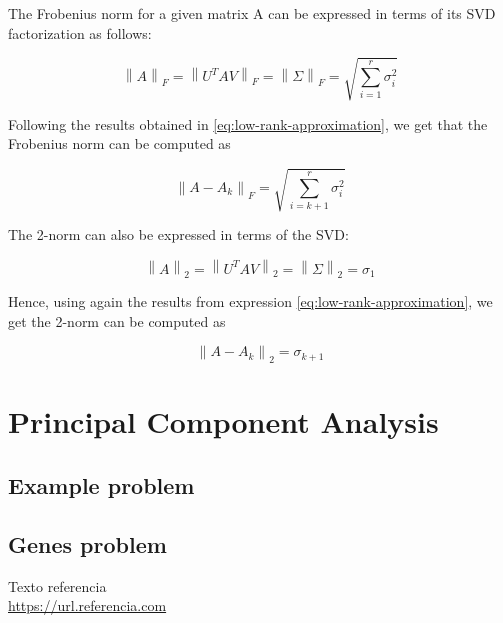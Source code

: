 \documentclass[11pt,a4paper]{article}
\begin{document}
The Frobenius norm for a given matrix A can be expressed in terms of its SVD factorization as follows:

\[
  \left\lVert A \right\rVert_F =
  \left\lVert U^T A V \right\rVert_F =
  \left\lVert \Sigma \right\rVert_F =
  \sqrt{\sum_{i=1}^r \sigma_i^2}
\]

Following the results obtained in \eqref{eq:low-rank-approximation}, we get that the Frobenius norm
can be computed as

\[
  \left\lVert A - A_k \right\rVert_F = \sqrt{\sum_{i=k+1}^r \sigma_i^2}
\]

The 2-norm can also be expressed in terms of the SVD:

\[
  \left\lVert A \right\rVert_2 =
  \left\lVert U^T A V \right\rVert_2 =
  \left\lVert \Sigma \right\rVert_2 = \sigma_1
\]

Hence, using again the results from expression \eqref{eq:low-rank-approximation}, we get the 2-norm can
be computed as

\[
  \left\lVert A - A_k \right\rVert_2 = \sigma_{k+1}
\]

\section{Principal Component Analysis}

\subsection{Example problem}

\subsection{Genes problem}

\newpage

\begin{thebibliography}{5}

Texto referencia
\\\url{https://url.referencia.com}

\end{thebibliography}
\end{document}
